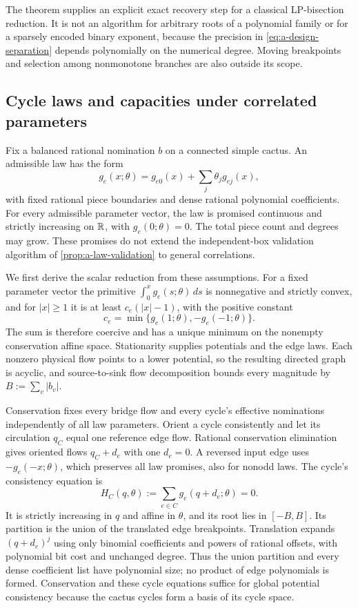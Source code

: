 The theorem supplies an explicit exact recovery step for a classical
LP-bisection reduction.  It is not an algorithm for arbitrary roots of
a polynomial family or for a sparsely encoded binary exponent, because
the precision in \eqref{eq:a-design-separation} depends polynomially on
the numerical degree.  Moving breakpoints and selection among nonmonotone
branches are also outside its scope.

\subsection{Cycle laws and capacities under correlated parameters}

Fix a balanced rational nomination $b$ on a connected simple cactus.
An admissible law has the form
\begin{equation}
 g_e(x;\theta)=g_{e0}(x)+\sum_j\theta_jg_{ej}(x),
 \label{eq:a-design-law}
\end{equation}
with fixed rational piece boundaries and dense rational polynomial
coefficients.  For every admissible parameter vector, the law is
promised continuous and strictly increasing on $\mathbb{R}$, with
$g_e(0;\theta)=0$.  The total piece count and degrees may grow.  These
promises do not extend the independent-box validation algorithm of
\cref{prop:a-law-validation} to general correlations.

We first derive the scalar reduction from these assumptions.
For a fixed parameter vector the primitive
$\int_0^x g_e(s;\theta)\,ds$ is nonnegative and strictly convex, and
for $|x|\ge1$ it is at least $c_e(|x|-1)$, with the positive constant
\[
 c_e=\min\{g_e(1;\theta),-g_e(-1;\theta)\}.
\]
The sum is therefore coercive and has a unique minimum on the nonempty
conservation affine space.  Stationarity supplies potentials and the
edge laws.  Each nonzero physical flow points to a lower potential,
so the resulting directed graph is acyclic, and source-to-sink flow
decomposition bounds every magnitude by
$B:=\sum_v|b_v|$.

Conservation fixes every bridge flow and every cycle's effective
nominations independently of all law parameters.  Orient a cycle
consistently and let its circulation $q_C$ equal one reference
edge flow.  Rational conservation elimination gives oriented flows
$q_C+d_e$ with one $d_e=0$.  A reversed input edge uses
$-g_e(-x;\theta)$, which preserves all law promises, also for
nonodd laws.  The cycle's consistency equation is
\begin{equation}
 H_C(q,\theta):=\sum_{e\in C}g_e(q+d_e;\theta)=0.
 \label{eq:a-design-cycle}
\end{equation}
It is strictly increasing in $q$ and affine in $\theta$, and its root
lies in $[-B,B]$.  Its partition is the union of the translated edge
breakpoints.  Translation expands $(q+d_e)^j$ using only binomial
coefficients and powers of rational offsets, with polynomial bit cost
and unchanged degree.  Thus the union partition and every dense
coefficient list have polynomial size; no product of edge polynomials
is formed.  Conservation and these cycle equations suffice
for global potential consistency because the cactus cycles form a
basis of its cycle space.

